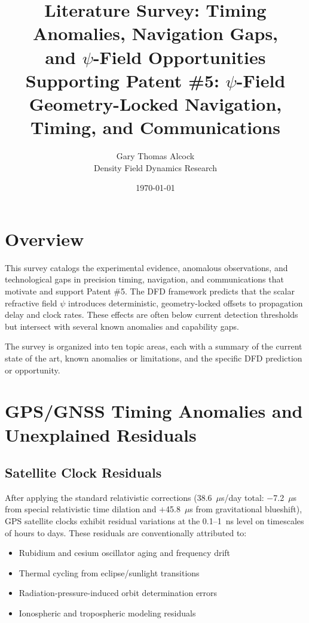 \documentclass[12pt,letterpaper]{article}
\title{Literature Survey: Timing Anomalies, Navigation Gaps,\\
and $\psi$-Field Opportunities\\[10pt]
\large Supporting Patent \#5: $\psi$-Field Geometry-Locked Navigation,
Timing, and Communications}
\author{Gary Thomas Alcock\\
Density Field Dynamics Research}
\date{\today}
\begin{document}
\maketitle
\tableofcontents
\newpage

\section{Overview}

This survey catalogs the experimental evidence, anomalous observations, and
technological gaps in precision timing, navigation, and communications that
motivate and support Patent \#5. The DFD framework predicts that the scalar
refractive field $\psi$ introduces deterministic, geometry-locked offsets to
propagation delay and clock rates. These effects are often below current
detection thresholds but intersect with several known anomalies and
capability gaps.

The survey is organized into ten topic areas, each with a summary of the
current state of the art, known anomalies or limitations, and the specific
DFD prediction or opportunity.

\section{GPS/GNSS Timing Anomalies and Unexplained Residuals}

\subsection{Satellite Clock Residuals}

After applying the standard relativistic corrections (38.6~$\mu$s/day
total: $-$7.2~$\mu$s from special relativistic time dilation and
$+$45.8~$\mu$s from gravitational blueshift), GPS satellite clocks exhibit
residual variations at the 0.1--1~ns level on timescales of hours to
days. These residuals are conventionally attributed to:

\begin{itemize}
\item Rubidium and cesium oscillator aging and frequency drift
\item Thermal cycling from eclipse/sunlight transitions
\item Radiation-pressure-induced orbit determination errors
\item Ionospheric and tropospheric modeling residuals
\end{itemize}
\end{document}
